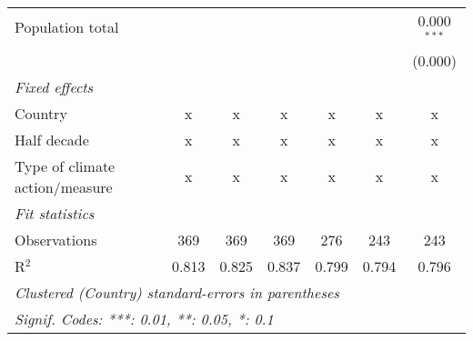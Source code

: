 \begin{tabular}{lcccccc}
   Population total                                              &         &                &                &                &                & 0.000$^{***}$\\   
                                                                 &         &                &                &                &                & (0.000)\\   
   \emph{Fixed effects}\\
   Country                                                       & x       & x              & x              & x              & x              & x\\  
   Half decade                                                   & x       & x              & x              & x              & x              & x\\  
   Type of climate action/measure                                & x       & x              & x              & x              & x              & x\\  
   \midrule \emph{Fit statistics}\\
   Observations                                                  & 369     & 369            & 369            & 276            & 243            & 243\\  
   R$^2$                                                         & 0.813   & 0.825          & 0.837          & 0.799          & 0.794          & 0.796\\  
   \midrule
   \multicolumn{7}{l}{\emph{Clustered (Country) standard-errors in parentheses}}\\
   \multicolumn{7}{l}{\emph{Signif. Codes: ***: 0.01, **: 0.05, *: 0.1}}\\
\end{tabular}
\par\endgroup


